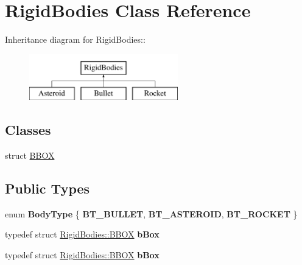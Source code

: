 \hypertarget{classRigidBodies}{
\section{RigidBodies Class Reference}
\label{classRigidBodies}
}
Inheritance diagram for RigidBodies::\begin{figure}[H]
\begin{center}
\leavevmode
\includegraphics[height=2cm]{classRigidBodies}
\end{center}
\end{figure}
\subsection*{Classes}
\begin{DoxyCompactItemize}
\item 
struct \hyperlink{structRigidBodies_1_1BBOX}{BBOX}
\end{DoxyCompactItemize}
\subsection*{Public Types}
\begin{DoxyCompactItemize}
\item 
enum {\bfseries BodyType} \{ {\bfseries BT\_\-BULLET}, 
{\bfseries BT\_\-ASTEROID}, 
{\bfseries BT\_\-ROCKET}
 \}
\item 
\hypertarget{classRigidBodies_afe7b8db972814246e32e844f8a92f97c}{
typedef struct \hyperlink{structRigidBodies_1_1BBOX}{RigidBodies::BBOX} {\bfseries bBox}}
\label{classRigidBodies_afe7b8db972814246e32e844f8a92f97c}

\item 
\hypertarget{classRigidBodies_afe7b8db972814246e32e844f8a92f97c}{
typedef struct \hyperlink{structRigidBodies_1_1BBOX}{RigidBodies::BBOX} {\bfseries bBox}}
\label{classRigidBodies_afe7b8db972814246e32e844f8a92f97c}

\end{DoxyCompactItemize}
